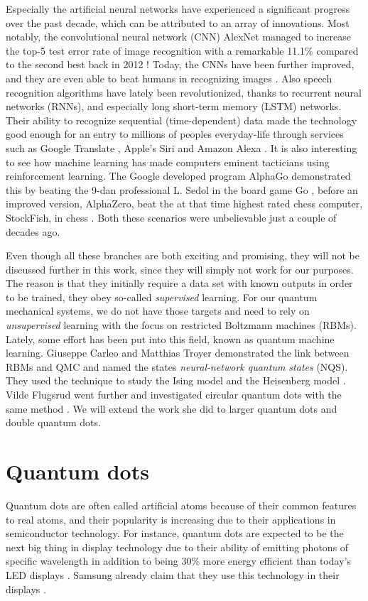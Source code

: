 Especially the artificial neural networks have experienced a significant progress over the past decade, which can be attributed to an array of innovations. Most notably, the convolutional neural network (CNN) AlexNet  managed to increase the top-5 test error rate of image recognition with a remarkable 11.1\% compared to the second best back in 2012 \cite{krizhevsky_imagenet_2012}! Today, the CNNs have been further improved, and they are even able to beat humans in recognizing images \cite{alom_history_2018}. Also speech recognition algorithms have lately been revolutionized, thanks to recurrent neural networks (RNNs), and especially long short-term memory (LSTM) networks. Their ability to recognize sequential (time-dependent) data made the technology good enough for an entry to millions of peoples everyday-life through services such as Google Translate \cite{wu_googles_2016}, Apple's Siri \cite{smith_ios_2016} and Amazon Alexa \cite{noauthor_bringing_nodate}. It is also interesting to see how machine learning has made computers eminent tacticians using reinforcement learning. The Google developed program AlphaGo demonstrated this by beating the 9-dan professional L. Sedol in the board game Go \cite{noauthor_alphago_nodate}, before an improved version, AlphaZero, beat the at that time highest rated chess computer, StockFish, in chess \cite{klein_mikeklein_googles_nodate}. Both these scenarios were unbelievable just a couple of decades ago.

Even though all these branches are both exciting and promising, they will not be discussed further in this work, since they will simply not work for our purposes. The reason is that they initially require a data set with known outputs in order to be trained, they obey so-called \textit{supervised} learning. For our quantum mechanical systems, we do not have those targets and need to rely on \textit{unsupervised} learning with the focus on restricted Boltzmann machines (RBMs). Lately, some effort has been put into this field, known as quantum machine learning. Giuseppe Carleo and Matthias Troyer demonstrated the link between RBMs and QMC and named the states \textit{neural-network quantum states} (NQS). They used the technique to study the Ising model and the Heisenberg model \cite{carleo_solving_2017}. Vilde Flugsrud went further and investigated circular quantum dots with the same method \cite{flugsrud_vilde_moe_solving_nodate}. We will extend the work she did to larger quantum dots and double quantum dots.

\section{Quantum dots}
Quantum dots are often called artificial atoms because of their common features to real atoms, and their popularity is increasing due to their applications in semiconductor technology. For instance, quantum dots are expected to be the next big thing in display technology due to their ability of emitting photons of specific wavelength in addition to being 30\% more energy efficient than today's LED displays \cite{manders_8.3:_2015}. Samsung already claim that they use this technology in their displays \cite{noauthor_2019_nodate}.

